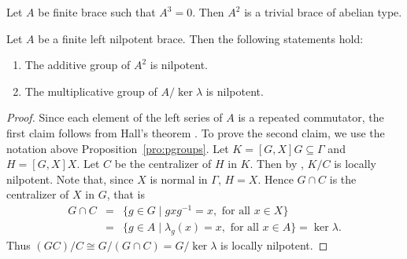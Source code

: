 \begin{exercise}
    Let $A$ be finite brace such that $A^3=0$. Then 
    $A^2$ is a trivial brace of abelian type.
\end{exercise}


\begin{theorem}
    \label{thm:A2}
    Let $A$ be a finite left nilpotent brace. Then the following statements
    hold:
    \begin{enumerate}
        \item The additive group of $A^2$ is nilpotent.
        \item The multiplicative group of $A/\ker\lambda$ is nilpotent.
    \end{enumerate}
\end{theorem}

\begin{proof}
    Since each element of the left series of $A$ is a repeated commutator, the
    first claim follows from Hall's theorem \cite[Theorem~4]{Hall}.
    To prove the second claim, we use the notation above
    Proposition~\ref{pro:pgroups}. Let $K=[G,X]G\subseteq \Gamma$ and
    $H=[G,X]X$. Let $C$ be the centralizer of $H$ in $K$. Then by
    \cite[Theorem~4]{Hall}, $K/C$ is locally nilpotent. Note
    that, since $X$ is normal in $\Gamma$, $H=X$. Hence $G\cap C$ is the
    centralizer of $X$ in $G$, that is
    \begin{eqnarray*}G\cap C&=&\{ g\in G\mid gxg^{-1}=x, \text{ for all } x\in X\}\\
    &=&\{ g\in A\mid \lambda_g(x)=x, \text{ for all } x\in A\}=\ker\lambda.
    \end{eqnarray*}
     Thus $(GC)/C\cong G/(G\cap
     C)=G/\ker\lambda$ is locally nilpotent.
\end{proof}



